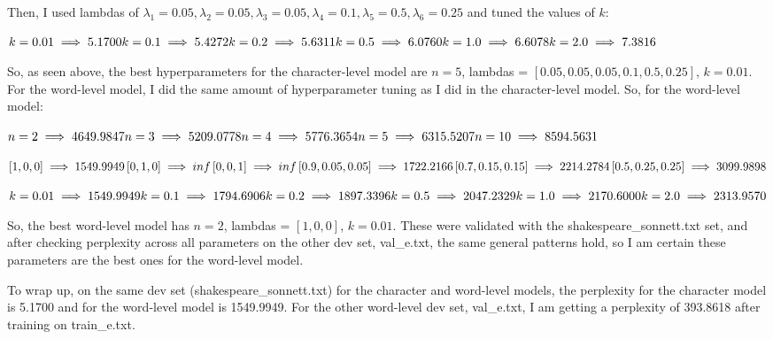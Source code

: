 \begin{solution}
Then, I used lambdas of $\lambda_1 = 0.05, \lambda_2 = 0.05, \lambda_3 = 0.05, \lambda_4 = 0.1, \lambda_5 = 0.5, \lambda_6 = 0.25$ and tuned the values of $k$:

$k = 0.01 \implies 5.1700\\
k = 0.1 \implies 5.4272\\
k = 0.2 \implies 5.6311\\
k = 0.5 \implies 6.0760\\
k = 1.0 \implies 6.6078\\
k = 2.0 \implies 7.3816$

So, as seen above, the best hyperparameters for the character-level model are $n = 5$, lambdas = $\left[0.05, 0.05, 0.05, 0.1, 0.5, 0.25\right]$, $k = 0.01$. For the word-level model, I did the same amount of hyperparameter tuning as I did in the character-level model. So, for the word-level model:

$n = 2 \implies 4649.9847\\
n = 3 \implies 5209.0778\\
n = 4 \implies 5776.3654\\
n = 5 \implies 6315.5207\\
n = 10 \implies 8594.5631$

$\left[1, 0, 0\right] \implies 1549.9949\\
\left[0, 1, 0\right] \implies inf\\
\left[0, 0, 1\right] \implies inf\\
\left[0.9, 0.05, 0.05\right] \implies 1722.2166\\
\left[0.7, 0.15, 0.15\right] \implies 2214.2784\\
\left[0.5, 0.25, 0.25\right] \implies 3099.9898$

$k = 0.01 \implies 1549.9949\\
k = 0.1 \implies 1794.6906\\
k = 0.2 \implies 1897.3396\\
k = 0.5 \implies 2047.2329\\
k = 1.0 \implies 2170.6000\\
k = 2.0 \implies 2313.9570$

So, the best word-level model has $n = 2$, lambdas = $\left[1, 0, 0\right]$, $k = 0.01$. These were validated with the shakespeare\_sonnett.txt set, and after checking perplexity across all parameters on the other dev set, val\_e.txt, the same general patterns hold, so I am certain these parameters are the best ones for the word-level model.

To wrap up, on the same dev set (shakespeare\_sonnett.txt) for the character and word-level models, the perplexity for the character model is 5.1700 and for the word-level model is 1549.9949. For the other word-level dev set, val\_e.txt, I am getting a perplexity of 393.8618 after training on train\_e.txt.


\end{solution}
